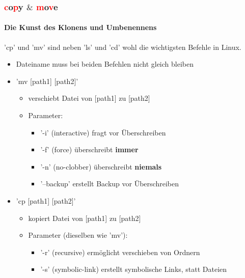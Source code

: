 \documentclass[12pt,utf8, handout]{beamer}
\begin{document}
\begin{frame}
\frametitle{\textcolor{red}{c}o\textcolor{red}{p}y $\&$ \textcolor{red}{m}o\textcolor{red}{v}e}
\framesubtitle{\textcolor{ownDarkOr}{Die Kunst des Klonens und Umbenennens}}
'cp' und 'mv' sind neben 'ls' und 'cd' wohl die wichtigsten Befehle in Linux.
\begin{itemize}
	\item Dateiname muss bei beiden Befehlen nicht gleich bleiben
	\item 'mv [path1] [path2]'
	\begin{itemize}
		\item verschiebt Datei von [path1] zu [path2]
		\item Parameter:
		\begin{itemize}[<+->]
			\item {\scriptsize '-i' (interactive) fragt vor Überschreiben}
			\item {\scriptsize '-f' (force) überschreibt \textbf{immer}}
			\item {\scriptsize '-n' (no-clobber) überschreibt \textbf{niemals}}
			\item {\scriptsize '--backup' erstellt Backup vor Überschreiben}
		\end{itemize}
	\end{itemize}
	\item 'cp [path1] [path2]'
	\begin{itemize}
		\item kopiert Datei von [path1] zu [path2]
		\item Parameter {\scriptsize (dieselben wie 'mv')}:
		\begin{itemize}[<+->]
			\item {\scriptsize '-r' (recursive) ermöglicht verschieben von Ordnern}
			\item {\scriptsize '-s' (symbolic-link) erstellt symbolische Links, statt Dateien}
		\end{itemize}
	\end{itemize}
\end{itemize}
\end{frame}
\end{document}
